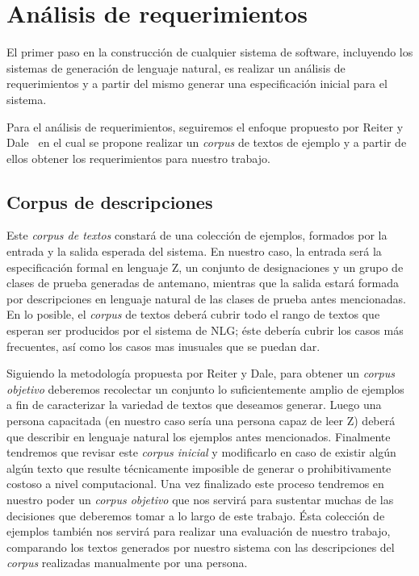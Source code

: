 \chapter{Análisis de requerimientos}
\label{cap:corpus}

El primer paso en la construcción de cualquier sistema de software, incluyendo los sistemas de generación de lenguaje natural, es realizar un análisis de requerimientos y a partir del mismo generar una especificación inicial para el sistema. 

Para el análisis de requerimientos, seguiremos el enfoque propuesto por Reiter y Dale~\cite{reiter_dale} en el cual se propone realizar un \emph{corpus} de textos de ejemplo y a partir de ellos obtener los requerimientos para nuestro trabajo.  

\section{Corpus de descripciones}                 

Este \emph{corpus de textos} constará de una colección de ejemplos, formados por la entrada y la salida esperada del sistema. En nuestro caso, la entrada será la especificación formal en lenguaje Z, un conjunto de designaciones y un grupo de clases de prueba generadas de antemano, mientras que la salida estará formada por descripciones en lenguaje natural de las clases de prueba antes mencionadas. En lo posible, el \emph{corpus} de textos deberá cubrir todo el rango de textos que esperan ser producidos por el sistema de NLG; éste debería cubrir los casos más frecuentes, así como los casos mas inusuales que se puedan dar.

Siguiendo la metodología propuesta por Reiter y Dale, para obtener un \emph{corpus objetivo} deberemos recolectar un conjunto lo suficientemente amplio de ejemplos a fin de caracterizar la variedad de textos que deseamos generar. Luego una persona capacitada (en nuestro caso sería una persona capaz de leer Z) deberá que describir en lenguaje natural los ejemplos antes mencionados. Finalmente tendremos que revisar este \emph{corpus inicial} y modificarlo en caso de existir algún algún texto que resulte técnicamente imposible de generar o prohibitivamente costoso a nivel computacional. Una vez finalizado este proceso tendremos en nuestro poder un \emph{corpus objetivo} que nos servirá para sustentar muchas de las decisiones que deberemos tomar a lo largo de este trabajo. Ésta colección de ejemplos también nos servirá para realizar una evaluación de nuestro trabajo, comparando los textos generados por nuestro sistema con las descripciones del \emph{corpus} realizadas manualmente por una persona.

